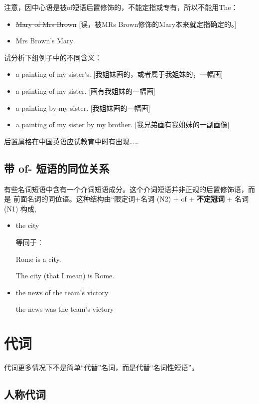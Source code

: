 注意，因中心语是被of短语后置修饰的，不能定指或专有，所以不能用The：
\begin{itemize}
\item \sout{Mary of Mrs Brown} [误，被MRs Brown修饰的Mary本来就定指确定的。]

\item Mrs Brown's Mary
\end{itemize}

试分析下组例子中的不同含义：
\begin{itemize}
\item a painting of my sister's. [我姐妹画的，或者属于我姐妹的，一幅画]
\item a painting of my sister. [画有我姐妹的一幅画]
\item a painting by my sister. [我姐妹画的一幅画]
\item a painting of my sister by my brother. [我兄弟画有我姐妹的一副画像]
\end{itemize}


后置属格在中国英语应试教育中时有出现……

\subsection{带 of- 短语的同位关系}

有些名词短语中含有一个介词短语成分。这个介词短语并非正规的后置修饰语，而是
前面名词的同位语。这种结构由“限定词+名词 (N2) + of + \textbf{不定冠词} + 名词 (N1) 构成,

\begin{itemize}
\item the city 

  等同于：

  Rome is a city.

  The city (that I mean) is Rome.

\item the news of the team's victory

  the news was the team's victory
\end{itemize}


\section{代词}

代词更多情况下不是简单“代替”名词，而是代替“名词性短语”。

\subsection{人称代词}

